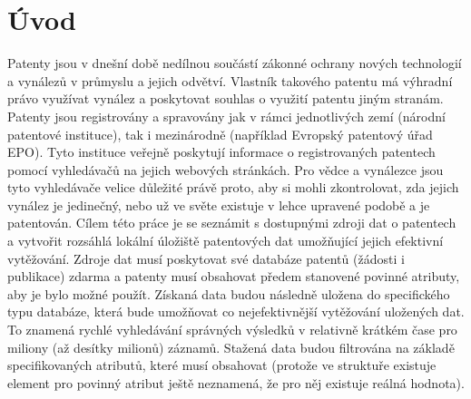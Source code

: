 \chapter{Úvod}
Patenty jsou v dnešní době nedílnou součástí zákonné ochrany nových technologií a vynálezů v průmyslu a jejich odvětví. Vlastník takového patentu má výhradní právo využívat vynález a poskytovat souhlas o využití patentu jiným stranám. Patenty jsou registrovány a spravovány jak v rámci jednotlivých zemí (národní patentové instituce), tak i mezinárodně (například Evropský patentový úřad \gls{EPO}). Tyto instituce veřejně poskytují informace o registrovaných patentech pomocí vyhledávačů na jejich webových stránkách. Pro vědce a vynálezce jsou tyto vyhledávače velice důležité právě proto, aby si mohli zkontrolovat, zda jejich vynález je jedinečný, nebo už ve světe existuje v lehce upravené podobě a je patentován.
\newline
\indent Cílem této práce je se seznámit s dostupnými zdroji dat o patentech a vytvořit rozsáhlá lokální úložiště patentových dat umožňující jejich efektivní vytěžování. Zdroje dat musí poskytovat své databáze patentů (žádosti i publikace) zdarma a patenty musí obsahovat předem stanovené povinné atributy, aby je bylo možné použít. Získaná data budou následně uložena do specifického typu databáze, která bude umožňovat co nejefektivnější vytěžování uložených dat. To znamená rychlé vyhledávání správných výsledků v relativně krátkém čase pro miliony (až desítky milionů) záznamů. Stažená data budou filtrována na základě specifikovaných atributů, které musí obsahovat (protože ve struktuře existuje element pro povinný atribut ještě neznamená, že pro něj existuje reálná hodnota).
